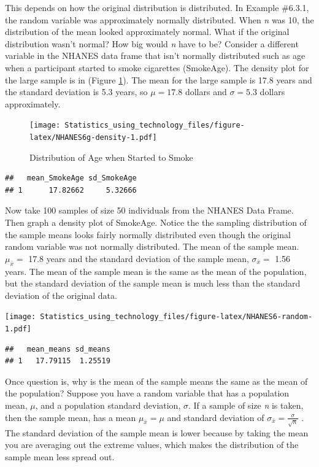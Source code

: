 \documentclass[]{book}
\begin{document}
This depends on how the original distribution is distributed. In Example \#6.3.1, the random variable was approximately normally distributed. When \emph{n} was 10, the distribution of the mean looked approximately normal. What if the original distribution wasn't normal? How big would \emph{n} have to be? Consider a different variable in the NHANES data frame that isn't normally distributed such as age when a participant started to smoke cigarettes (SmokeAge). The density plot for the large sample is in (Figure \ref{fig:NHANES6g-density}). The mean for the large sample is 17.8 years and the standard deviation is 5.3 years, so \(\mu=17.8\) dollars and \(\sigma=5.3\) dollars approximately.



\begin{figure}
\centering
\texttt{[image: Statistics\_using\_technology\_files/figure-latex/NHANES6g-density-1.pdf]}
\caption{\label{fig:NHANES6g-density}Distribution of Age when Started to Smoke}
\end{figure}

\begin{verbatim}
##   mean_SmokeAge sd_SmokeAge
## 1      17.82662     5.32666
\end{verbatim}

Now take 100 samples of size 50 individuals from the NHANES Data Frame. Then graph a density plot of SmokeAge. Notice the the sampling distribution of the sample means looks fairly normally distributed even though the original random variable was not normally distributed. The mean of the sample mean. \(\mu_{ \bar{x}}=\) 17.8 years and the standard deviation of the sample mean, \(\sigma_{\bar{x}}=\) 1.56 years. The mean of the sample mean is the same as the mean of the population, but the standard deviation of the sample mean is much less than the standard deviation of the original data.

\texttt{[image: Statistics\_using\_technology\_files/figure-latex/NHANES6-random-1.pdf]}

\begin{verbatim}
##   mean_means sd_means
## 1   17.79115  1.25519
\end{verbatim}

Once question is, why is the mean of the sample means the same as the mean of the population? Suppose you have a random variable that has a population mean, \(\mu\), and a population standard deviation, \(\sigma\). If a sample of size \emph{n} is taken, then the sample mean, has a mean \(\mu_{ \bar{x}}=\mu\) and standard deviation of \(\sigma_{ \bar{x}}=\frac{\sigma}{\sqrt{n}}\) . The standard deviation of the sample mean is lower because by taking the mean you are averaging out the extreme values, which makes the distribution of the sample mean less spread out.
\end{document}
